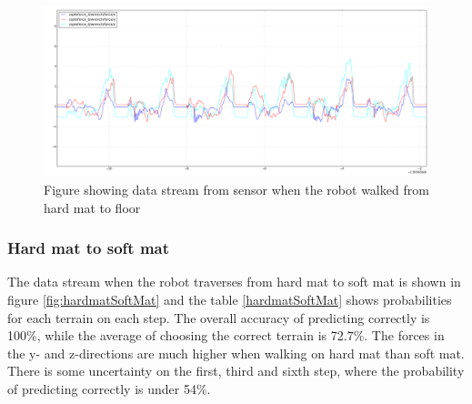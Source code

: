 \documentclass[USenglish]{ifimaster}  %
\begin{document}
\begin{figure}[h]
	\centering
	\includegraphics[width=\textwidth,height=\textheight,keepaspectratio]{Figures/MB3_3_Gulvet}
	\caption{Figure showing data stream from sensor when the robot walked from hard mat to floor}
	\label{fig:mb3Gulvet}
\end{figure}
	
	
\begin{table}[h]
	\centering
	\caption{The table showing probability of each terrain per step walking from hard mat to floor. Marked green represent correct prediction and correct terrain, red represent wrong prediction and yellow is the correct prediction if it got wrong.}
	\label{tab:mb3Gulvet}
\end{table}
\FloatBarrier
\clearpage

\subsubsection{Hard mat to soft mat} \label{sec:hmssm}
 The data stream when the robot traverses from hard mat to soft mat is shown in figure \ref{fig:hardmatSoftMat} and the table \ref{hardmatSoftMat} shows probabilities for each terrain on each step. The overall accuracy of predicting correctly is 100\%, while the average of choosing the correct terrain is 72.7\%. The forces in the y- and z-directions are much higher when walking on hard mat than soft mat. There is some uncertainty on the first, third and sixth step, where the probability of predicting correctly is under 54\%.
\end{document}
